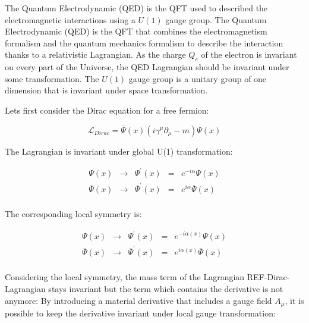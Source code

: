       The Quantum Electrodynamic (QED) is the QFT used to described the electromagnetic interactions using a $U(1)$ gauge group.
     The Quantum Electrodynamic (QED) is the QFT that combines the electromagnetism formalism and the quantum mechanics formalism to describe the interaction thanks to a relativistic Lagrangian.
     As the charge $Q_e$ of the electron is invariant on every part of the Universe, the QED Lagrangian should be invariant under some transformation.
     The $U(1)$ gauge group is a unitary group of one dimension that is invariant under space transformation.

      Lets first consider the Dirac equation for a free fermion:
      
      \begin{equation}
        \mathcal{L}_{Dirac} = \overline{\Psi}\left(x\right) \left(i \gamma^{\mu}\partial_{\mu} - m \right) \Psi\left(x\right)
      \end{equation}

      The Lagrangian is invariant under global U(1) transformation:

      \begin{equation}
            \begin{array}{rrccr}
             \Psi \left(x \right) & \rightarrow & \Psi^{'} \left(x \right)  & = & e^{-i\alpha} \Psi\left(x\right) \\
             \overline{\Psi}\left(x\right) & \rightarrow & \overline{\Psi}^{'}\left(x\right) & = & e^{i\alpha}  \overline{\Psi}\left(x\right) \\
            \end{array}
      \end{equation}

      The corresponding local symmetry is:

      \begin{equation}
            \begin{array}{rcccr}
             \Psi\left(x\right) & \rightarrow & \Psi^{'} \left(x \right) & = & e^{-i\alpha(x)} \Psi\left(x\right) \\
             \overline{\Psi}\left(x\right) & \rightarrow & \overline{\Psi}^{'}\left(x\right) & = & e^{i\alpha(x)}  \overline{\Psi}\left(x\right) \\
            \end{array}
      \end{equation}

      Considering the local symmetry, the mass term of the Lagrangian REF-Dirac-Lagrangian stays invariant but the term which contains the derivative is not anymore:
      By introducing a material derivative that includes a gauge field $A_{\mu}$, it is possible to keep the derivative invariant under local gauge transformation:

